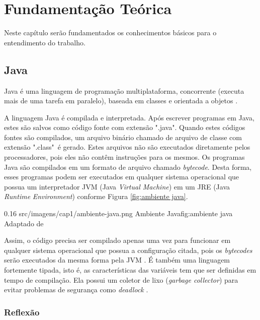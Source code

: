 \chapter{Fundamentação Teórica}
\label{ch:fundamentacao}
\par Neste capítulo ser\~ao fundamentados os conhecimentos b\'asicos para o entendimento do trabalho.

\section{Java}

\par Java é uma linguagem de programação multiplataforma, concorrente (executa mais de uma tarefa em paralelo), baseada em classes e orientada a objetos \cite{joy2000java}.

\par A linguagem Java é compilada e interpretada. Após escrever programas em Java, estes são salvos como código fonte com extensão ".java". Quando estes códigos fontes são compilados, um arquivo binário chamado de arquivo de classe com extensão ".class"\ é gerado. Estes arquivos não são executados diretamente pelos processadores, pois eles não contêm instruções para os mesmos. Os programas Java são compilados em um formato de arquivo chamado \textit{bytecode}. Desta forma, esses programas podem ser executados em qualquer sistema operacional que possua um interpretador JVM (Java \textit{Virtual Machine}) em um JRE (Java \textit{Runtime} \textit{Environment}) conforme Figura \ref{fig:ambiente java}.

\begin{image}
{0.16}
{src/imagens/cap1/ambiente-java.png}
{Ambiente Java}{fig:ambiente java}
{Adaptado de }
\end{image}

Assim, o código precisa ser compilado apenas uma vez para funcionar em qualquer sistema operacional que possua a configuração citada, pois os \textit{bytecodes} serão executados da mesma forma pela JVM \cite{arnold2005java}. É também uma linguagem fortemente tipada, isto é, as características das variáveis tem que ser definidas em tempo de compilação. Ela possui um coletor de lixo (\textit{garbage collector}) para evitar problemas de segurança como \textit{deadlock} \cite{joy2000java}.

\subsection{Reflexão}

